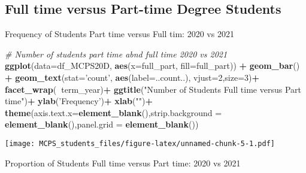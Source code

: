 \documentclass[]{article}
\newenvironment{Shaded}{\begin{snugshade}}{\end{snugshade}}
\newcommand{\CommentTok}[1]{\textcolor[rgb]{0.56,0.35,0.01}{\textit{#1}}}
\newcommand{\DataTypeTok}[1]{\textcolor[rgb]{0.13,0.29,0.53}{#1}}
\newcommand{\DecValTok}[1]{\textcolor[rgb]{0.00,0.00,0.81}{#1}}
\newcommand{\KeywordTok}[1]{\textcolor[rgb]{0.13,0.29,0.53}{\textbf{#1}}}
\newcommand{\NormalTok}[1]{#1}
\newcommand{\OperatorTok}[1]{\textcolor[rgb]{0.81,0.36,0.00}{\textbf{#1}}}
\newcommand{\StringTok}[1]{\textcolor[rgb]{0.31,0.60,0.02}{#1}}
\begin{document}
\hypertarget{full-time-versus-part-time-degree-students}{%
\subsection{Full time versus Part-time Degree
Students}\label{full-time-versus-part-time-degree-students}}

Frequency of Students Part time versus Full tim: 2020 vs 2021

\begin{Shaded}
\begin{Highlighting}[]
\CommentTok{# Number of students part time abnd full time  2020 vs 2021}
\KeywordTok{ggplot}\NormalTok{(}\DataTypeTok{data=}\NormalTok{df_MCPS20D, }\KeywordTok{aes}\NormalTok{(}\DataTypeTok{x=}\NormalTok{full_part, }\DataTypeTok{fill=}\NormalTok{full_part)) }\OperatorTok{+}
\StringTok{      }\KeywordTok{geom_bar}\NormalTok{() }\OperatorTok{+}
\StringTok{      }\KeywordTok{geom_text}\NormalTok{(}\DataTypeTok{stat=}\StringTok{'count'}\NormalTok{, }\KeywordTok{aes}\NormalTok{(}\DataTypeTok{label=}\NormalTok{..count..), }\DataTypeTok{vjust=}\DecValTok{2}\NormalTok{,}\DataTypeTok{size=}\DecValTok{3}\NormalTok{)}\OperatorTok{+}
\StringTok{      }\KeywordTok{facet_wrap}\NormalTok{(}\OperatorTok{~}\NormalTok{term_year)}\OperatorTok{+}
\StringTok{      }\KeywordTok{ggtitle}\NormalTok{(}\StringTok{"Number of Students Full time versus Part time"}\NormalTok{)}\OperatorTok{+}
\StringTok{      }\KeywordTok{ylab}\NormalTok{(}\StringTok{'Frequency'}\NormalTok{)}\OperatorTok{+}
\StringTok{      }\KeywordTok{xlab}\NormalTok{(}\StringTok{""}\NormalTok{)}\OperatorTok{+}
\StringTok{      }\KeywordTok{theme}\NormalTok{(}\DataTypeTok{axis.text.x=}\KeywordTok{element_blank}\NormalTok{(),}\DataTypeTok{strip.background =} \KeywordTok{element_blank}\NormalTok{(),}\DataTypeTok{panel.grid =} \KeywordTok{element_blank}\NormalTok{())}
\end{Highlighting}
\end{Shaded}

\texttt{[image: MCPS\_students\_files/figure-latex/unnamed-chunk-5-1.pdf]}

Proportion of Students Full time versus Part time: 2020 vs 2021
\end{document}
